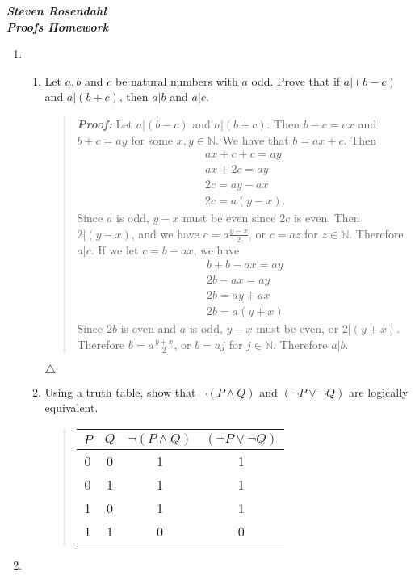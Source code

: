 \documentclass{article}
\newcommand{\Proof}{\textit{\textbf{Proof: }}}
\newcommand{\NN}{\mathbb{N}}
\begin{document}
\noindent\textit{\textbf{Steven Rosendahl}}\\
\textit{\textbf{Proofs Homework}}
\begin{enumerate}
\item
\begin{enumerate}
\item Let $a,b$ and $c$ be natural numbers with $a$ odd.
Prove that if $a|(b -c)$ and $a|(b+c)$, then $a|b$ and $a|c$.
\begin{quote}
\indent \Proof Let $a|(b-c)$ and $a|(b + c)$.
Then $b-c = ax$ and $b + c = ay$ for some $x,y\in \NN$.
We have that $b = ax + c$.
Then 
\begin{gather*}
ax + c + c = ay\\
ax + 2c = ay\\
2c = ay - ax\\
2c = a(y-x).
\end{gather*}
Since $a$ is odd, $y-x$ must be even since $2c$ is even.
Then $2 | (y-x)$, and we have $c = a\frac{y-x}{2}$, or $c = az$ for $z\in\NN$.
Therefore $a | c$.
If we let $c = b-ax$, we have
\begin{gather*}
b + b - ax = ay\\
2b - ax = ay\\
2b = ay + ax\\
2b = a(y + x)
\end{gather*}
Since $2b$ is even and $a$ is odd, $y-x$ must be even, or $2 | (y+x)$.
Therefore $b = a\frac{y+x}{2}$, or $b = aj$ for $j\in\NN$.
Therefore $a | b$.
\end{quote}
$\triangle$
\item Using a truth table, show that $\neg(P\wedge Q)$ and $(\neg P \vee \neg Q)$ are logically equivalent.\\
\begin{quote}
\begin{center}
\begin{tabular}{c | c | c | c}
$P$ & $Q$ & $\neg(P\wedge Q)$ & $(\neg P \vee \neg Q)$\\
\hline
0 & 0 & 1 & 1\\
0 & 1 & 1 & 1\\
1 & 0 & 1 & 1\\
1 & 1 & 0 & 0
\end{tabular}
\end{center}
\end{quote}
\end{enumerate}
\newpage
\item
\begin{enumerate}

\end{enumerate}
\end{enumerate}
\end{document}
